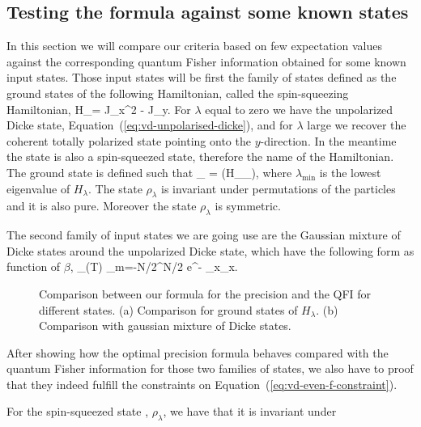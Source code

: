 {\subsection{Testing the formula against some known states}
\label{sec:vd-comparison-with-qfi}

In this section we will compare our criteria based on few expectation values against the corresponding quantum Fisher information obtained for some known input states.
Those input states will be first the family of states defined as the ground states of the following Hamiltonian, called the spin-squeezing Hamiltonian,
\be
  H_\lambda = J_x^2 - \lambda J_y.
\ee
For $\lambda$ equal to zero we have the unpolarized Dicke state, Equation~{(\ref{eq:vd-unpolarised-dicke})}, and for $\lambda$ large we recover the coherent totally polarized state pointing onto the $y$-direction.
In the meantime the state is also a spin-squeezed state, therefore the name of the Hamiltonian.
The ground state is defined such that
\be
  \lambda_{\min} = \tr(H_\lambda \rho_\lambda),
\ee
where $\lambda_{\min}$ is the lowest eigenvalue of $H_\lambda$.
The state $\rho_\lambda$ is invariant under permutations of the particles and it is also pure.
Moreover the state $\rho_\lambda$ is symmetric.

The second family of input states we are going use are the Gaussian mixture of Dicke states around the unpolarized Dicke state, which have the following form as function of $\beta$,
\be
  \rho_{(T)} \propto \sum_{m=-N/2}^{N/2} e^{- } _x_x.
\ee

\begin{figure}[htp]
  \centering
  \caption[Bound against known QFIs for different states.]{Comparison between our formula for the precision and the QFI for different states. (a) Comparison for ground states of $H_\lambda$. (b) Comparison with gaussian mixture of Dicke states.}
  \label{fig:bg-histograms}
\end{figure}

After showing how the optimal precision formula behaves compared with the quantum Fisher information for those two families of states, we also have to proof that they indeed fulfill the constraints on Equation~{(\ref{eq:vd-even-f-constraint})}.

For the spin-squeezed state , $\rho_\lambda$, we have that it is invariant under

}
